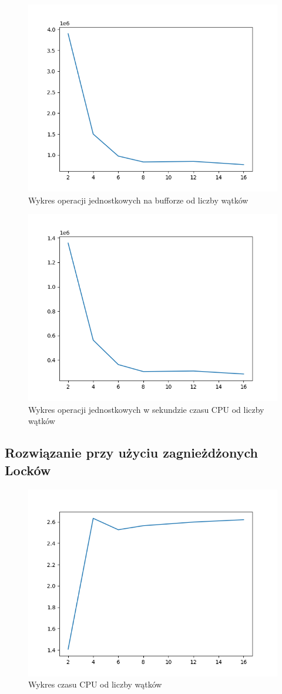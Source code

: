 \documentclass[12pt,a4paper,table]{article}
\begin{document}
    \begin{figure}[H]
        \centering
        \includegraphics[width=0.6\linewidth]{img/4_cond_count.png}
        \caption{Wykres operacji jednostkowych na bufforze od liczby wątków}
        \label{fig:4_cond_cpu}
    \end{figure}

    \begin{figure}[H]
        \centering
        \includegraphics[width=0.6\linewidth]{img/4_cond_count_per_cpu.png}
        \caption{Wykres operacji jednostkowych w sekundzie czasu CPU od liczby wątków}
        \label{fig:4_cond_cpu}
    \end{figure}

    \subsection{Rozwiązanie przy użyciu zagnieżdżonych Locków}

    \begin{figure}[H]
        \centering
        \includegraphics[width=0.6\linewidth]{img/lock_cpu.png}
        \caption{Wykres czasu CPU od liczby wątków}
        \label{fig:lock_cpu}
    \end{figure}
\end{document}
